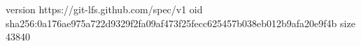 version https://git-lfs.github.com/spec/v1
oid sha256:0a176ae975a722d9329f2fa09af473f25fecc625457b038eb012b9afa20e9f4b
size 43840
